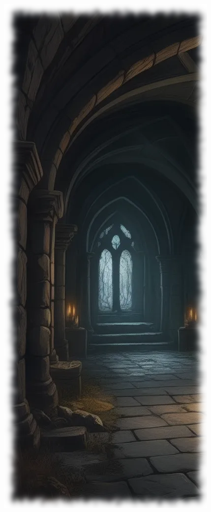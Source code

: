\begin{figure}[t]
\begin{center}
\includegraphics[scale=0.6]{img/ai-images/crypt.png}
\end{center}
\end{figure}

\vspace{4em}

\clearpage
